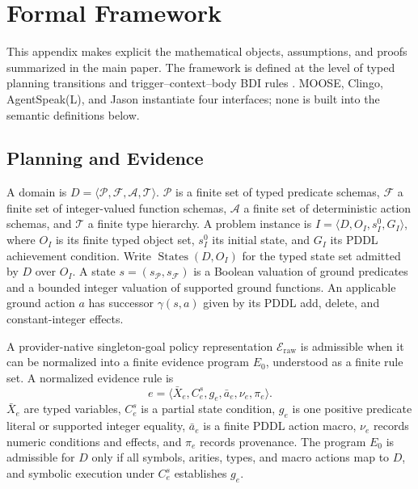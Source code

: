 \section{Formal Framework}
\label{app:formal-framework}

This appendix makes explicit the mathematical objects, assumptions, and proofs
summarized in the main paper. The framework is defined at the level of typed
planning transitions \cite{McDermott1998PDDL,FoxLong2003PDDL21} and
trigger--context--body BDI rules
\cite{Rao1996AgentSpeak,MeneguzziDeSilva2015PlanningBDI}. MOOSE, Clingo,
AgentSpeak(L), and Jason instantiate four interfaces; none is built into the
semantic definitions below.

\subsection{Planning and Evidence}

\begin{definition}
A domain is
$D=\langle\mathcal P,\mathcal F,\mathcal A,\mathcal T\rangle$.
$\mathcal P$ is a finite set of typed predicate schemas,
$\mathcal F$ a finite set of integer-valued function schemas,
$\mathcal A$ a finite set of deterministic action schemas, and
$\mathcal T$ a finite type hierarchy. A problem instance is
$I=\langle D,O_I,s_I^0,G_I\rangle$, where $O_I$ is its finite typed object set,
$s_I^0$ its initial state, and $G_I$ its PDDL achievement condition. Write
$\operatorname{States}(D,O_I)$ for the typed state set admitted by $D$ over
$O_I$. A state
$s=(s_{\mathcal P},s_{\mathcal F})$ is a Boolean valuation of ground predicates
and a bounded integer valuation of supported ground functions. An applicable
ground action $a$ has successor $\gamma(s,a)$ given by its PDDL add, delete, and
constant-integer effects.
\end{definition}

\begin{definition}
A provider-native singleton-goal policy representation
$\mathcal E_{\mathrm{raw}}$ is admissible when it can be normalized into a
finite evidence program $E_0$, understood as a finite rule set.
A normalized evidence rule is
\[
e=\langle\bar X_e,C_e^s,g_e,\bar a_e,\nu_e,\pi_e\rangle.
\]
$\bar X_e$ are typed variables, $C_e^s$ is a partial state condition, $g_e$ is
one positive predicate literal or supported integer equality, $\bar a_e$ is a
finite PDDL action macro, $\nu_e$ records numeric conditions and effects, and
$\pi_e$ records provenance. The program $E_0$ is admissible for $D$ only if
all symbols, arities, types, and macro actions map to $D$, and symbolic execution
under $C_e^s$ establishes $g_e$.
\end{definition}

